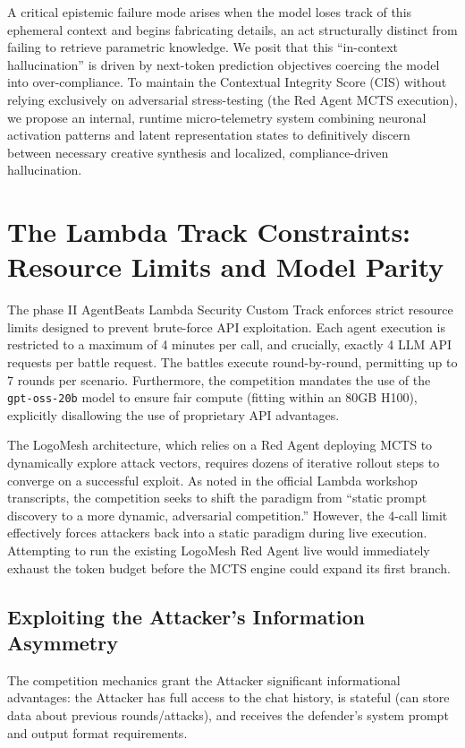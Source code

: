 \documentclass[11pt, a4paper]{article}
\begin{document}
A critical epistemic failure mode arises when the model loses track of this ephemeral context and begins fabricating details, an act structurally distinct from failing to retrieve parametric knowledge. We posit that this ``in-context hallucination'' is driven by next-token prediction objectives coercing the model into over-compliance. To maintain the Contextual Integrity Score (CIS) without relying exclusively on adversarial stress-testing (the Red Agent MCTS execution), we propose an internal, runtime micro-telemetry system combining neuronal activation patterns and latent representation states to definitively discern between necessary creative synthesis and localized, compliance-driven hallucination.

\section{The Lambda Track Constraints: Resource Limits and Model Parity}

The phase II AgentBeats Lambda Security Custom Track enforces strict resource limits designed to prevent brute-force API exploitation. Each agent execution is restricted to a maximum of 4 minutes per call, and crucially, exactly 4 LLM API requests per battle request. The battles execute round-by-round, permitting up to 7 rounds per scenario. Furthermore, the competition mandates the use of the \texttt{gpt-oss-20b} model to ensure fair compute (fitting within an 80GB H100), explicitly disallowing the use of proprietary API advantages.

The LogoMesh architecture, which relies on a Red Agent deploying MCTS to dynamically explore attack vectors, requires dozens of iterative rollout steps to converge on a successful exploit. As noted in the official Lambda workshop transcripts, the competition seeks to shift the paradigm from ``static prompt discovery to a more dynamic, adversarial competition.'' However, the 4-call limit effectively forces attackers back into a static paradigm during live execution. Attempting to run the existing LogoMesh Red Agent live would immediately exhaust the token budget before the MCTS engine could expand its first branch.

\subsection{Exploiting the Attacker's Information Asymmetry}
The competition mechanics grant the Attacker significant informational advantages: the Attacker has full access to the chat history, is stateful (can store data about previous rounds/attacks), and receives the defender's system prompt and output format requirements. 
\end{document}
